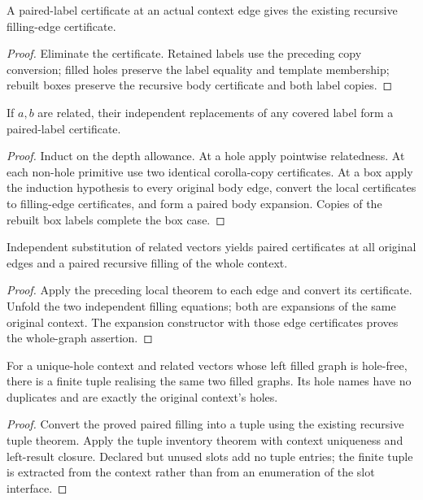 \begin{lemma}
A paired-label certificate at an actual context edge gives the existing recursive filling-edge certificate.
\end{lemma}
\begin{proof}
Eliminate the certificate. Retained labels use the preceding copy conversion; filled holes preserve the label equality and template membership; rebuilt boxes preserve the recursive body certificate and both label copies.
\end{proof}

\begin{lemma}
If $a,b$ are related, their independent replacements of any covered label form a paired-label certificate.
\end{lemma}
\begin{proof}
Induct on the depth allowance. At a hole apply pointwise relatedness. At each non-hole primitive use two identical corolla-copy certificates. At a box apply the induction hypothesis to every original body edge, convert the local certificates to filling-edge certificates, and form a paired body expansion. Copies of the rebuilt box labels complete the box case.
\end{proof}

\begin{lemma}
Independent substitution of related vectors yields paired certificates at all original edges and a paired recursive filling of the whole context.
\end{lemma}
\begin{proof}
Apply the preceding local theorem to each edge and convert its certificate. Unfold the two independent filling equations; both are expansions of the same original context. The expansion constructor with those edge certificates proves the whole-graph assertion.
\end{proof}

\begin{theorem}
For a unique-hole context and related vectors whose left filled graph is hole-free, there is a finite tuple realising the same two filled graphs. Its hole names have no duplicates and are exactly the original context's holes.
\end{theorem}
\begin{proof}
Convert the proved paired filling into a tuple using the existing recursive tuple theorem. Apply the tuple inventory theorem with context uniqueness and left-result closure. Declared but unused slots add no tuple entries; the finite tuple is extracted from the context rather than from an enumeration of the slot interface.
\end{proof}

